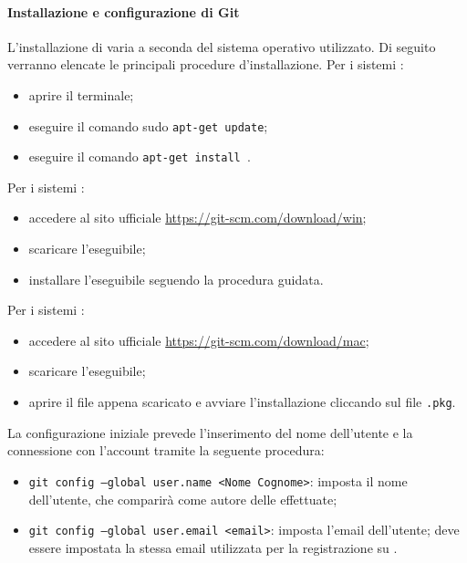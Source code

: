             \paragraph{Installazione e configurazione di Git}
            L'installazione di  varia a seconda del sistema operativo utilizzato. Di seguito verranno elencate le principali procedure d'installazione.
            \newline \newline
            Per i sistemi :
            \begin{itemize}
            	\item aprire il terminale;
            	\item eseguire il comando sudo \texttt{apt-get update};
            	\item eseguire il comando \texttt{apt-get install }.
            \end{itemize}
            Per i sistemi :
            \begin{itemize}
            	\item accedere al sito ufficiale \url{https://git-scm.com/download/win};
            	\item scaricare l'eseguibile;
            	\item installare l'eseguibile seguendo la procedura guidata.
            \end{itemize}
    	    Per i sistemi :
    	    \begin{itemize}
    	    	\item accedere al sito ufficiale \url{https://git-scm.com/download/mac};
    	    	\item scaricare l'eseguibile;
    	    	\item aprire il file appena scaricato e avviare l'installazione cliccando sul file \texttt{.pkg}.
    	    \end{itemize}
    	    La configurazione iniziale prevede l'inserimento del nome dell'utente e la connessione con l'account  tramite la seguente procedura:
    	    \begin{itemize}
    			\item \texttt{{git} config --global user.name <Nome Cognome>}: imposta il nome dell'utente, che comparirà come autore delle  effettuate;
    			\item \texttt{{git} config --global user.email <email>}: imposta l'email dell'utente; deve essere impostata la stessa email utilizzata per la registrazione su .
    		\end{itemize}
